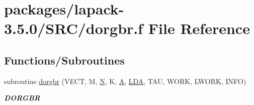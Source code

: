 \hypertarget{dorgbr_8f}{}\section{packages/lapack-\/3.5.0/\+S\+R\+C/dorgbr.f File Reference}
\label{dorgbr_8f}
\subsection*{Functions/\+Subroutines}
\begin{DoxyCompactItemize}
\item 
subroutine \hyperlink{group__doubleGBcomputational_ga3cef6a16beac76badd73886c843d2c31}{dorgbr} (V\+E\+C\+T, M, \hyperlink{polmisc_8c_a0240ac851181b84ac374872dc5434ee4}{N}, K, \hyperlink{classA}{A}, \hyperlink{example__user_8c_ae946da542ce0db94dced19b2ecefd1aa}{L\+D\+A}, T\+A\+U, W\+O\+R\+K, L\+W\+O\+R\+K, I\+N\+F\+O)
\begin{DoxyCompactList}\small\item\em {\bfseries D\+O\+R\+G\+B\+R} \end{DoxyCompactList}\end{DoxyCompactItemize}
